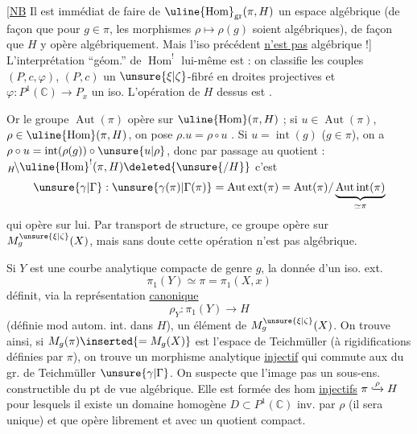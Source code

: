 [\uline{NB} Il est immédiat de faire de $\uline{\operatorname{Hom}}_{\operatorname{gr}}(\pi,H)$ un espace algébrique (de façon que pour $g\in\pi$, les morphismes $\rho\longmapsto\rho(g)$ soient algébriques), de façon que $H$ y opère algébriquement. Mais l'iso précédent \uline{n'est pas}  algébrique !]
L'interprétation ``géom.'' de $\operatorname{Hom}^!$ lui-même est : on classifie les couples $(P,c,\varphi)$, $(P,c)$ un
$\unsure{\xi|\zeta}$-fibré en droites projectives et $\varphi:P^1(\mathbb C)\longrightarrow P_x$ un iso. L'opération de $H$ dessus est .

Or le groupe $\operatorname{Aut}(\pi)$ opère  sur $\uline{\operatorname{Hom}}(\pi,H)$ ;  si $u\in\operatorname{Aut}(\pi)$, $\rho\in\uline{\operatorname{Hom}}(\pi,H)$, on pose $\rho.u=\rho\circ u$ . Si $u=\operatorname{int}(g)$ ($g\in\pi$), on a $\rho\circ u=\operatorname{int}(\rho(g))\circ\unsure{u|\rho}$, donc par passage au quotient : ${}_H\!\backslash\uline{\operatorname{Hom}}^!(\pi,H)\deleted{\unsure{/H}}$ c'est
\[
\unsure{\gamma|\Gamma}:\unsure{\gamma(\pi)|\Gamma(\pi)}=\operatorname{Aut\,ext}(\pi)=\operatorname{Aut}(\pi)/\underbrace{\operatorname{Aut\,int}(\pi)}_{\simeq\pi}
\]
qui opère sur lui. Par transport de structure, ce groupe opère sur $M_g^{\unsure{\xi|\zeta}}(X)$, mais sans doute cette opération n'est pas algébrique.

Si $Y$ est une courbe analytique compacte  de genre $g$, la donnée d'un iso. ext.
\[
\pi_1(Y)\simeq\pi=\pi_1(X,x)
\]
définit, via la représentation \uline{canonique}
\[
\rho_Y:\pi_1(Y)\longrightarrow H
\]
(définie mod autom. int. dans $H$), un élément de $M_g^{\unsure{\xi|\zeta}}(X)$. On trouve ainsi, si $M_g(\pi)\inserted{=M_g(X)}$ est l'espace de Teichmüller (à rigidifications définies par $\pi$), on trouve un morphisme analytique \uline{injectif}
qui commute aux  du gr. de Teichmüller $\unsure{\gamma|\Gamma}$. On suspecte que l'image  pas un sous-ens. constructible du pt de vue algébrique. Elle est formée des hom \uline{injectifs} $\pi\lhook\joinrel\xrightarrow{\rho}H$ pour lesquels il existe un domaine homogène $D\subset P^1(\mathbb C)$ inv. par $\rho$ (il sera unique) et que   opère librement et avec un quotient compact.


